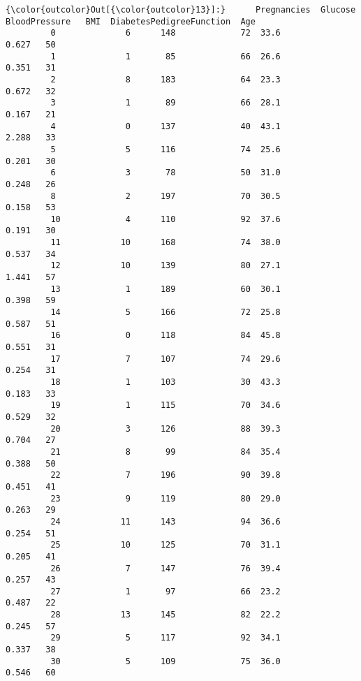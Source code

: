 \documentclass[11pt]{article}
\begin{document}
\begin{Verbatim}[commandchars=\\\{\}]
{\color{outcolor}Out[{\color{outcolor}13}]:}      Pregnancies  Glucose  BloodPressure   BMI  DiabetesPedigreeFunction  Age
         0              6      148             72  33.6                     0.627   50
         1              1       85             66  26.6                     0.351   31
         2              8      183             64  23.3                     0.672   32
         3              1       89             66  28.1                     0.167   21
         4              0      137             40  43.1                     2.288   33
         5              5      116             74  25.6                     0.201   30
         6              3       78             50  31.0                     0.248   26
         8              2      197             70  30.5                     0.158   53
         10             4      110             92  37.6                     0.191   30
         11            10      168             74  38.0                     0.537   34
         12            10      139             80  27.1                     1.441   57
         13             1      189             60  30.1                     0.398   59
         14             5      166             72  25.8                     0.587   51
         16             0      118             84  45.8                     0.551   31
         17             7      107             74  29.6                     0.254   31
         18             1      103             30  43.3                     0.183   33
         19             1      115             70  34.6                     0.529   32
         20             3      126             88  39.3                     0.704   27
         21             8       99             84  35.4                     0.388   50
         22             7      196             90  39.8                     0.451   41
         23             9      119             80  29.0                     0.263   29
         24            11      143             94  36.6                     0.254   51
         25            10      125             70  31.1                     0.205   41
         26             7      147             76  39.4                     0.257   43
         27             1       97             66  23.2                     0.487   22
         28            13      145             82  22.2                     0.245   57
         29             5      117             92  34.1                     0.337   38
         30             5      109             75  36.0                     0.546   60

\end{Verbatim}
\end{document}
